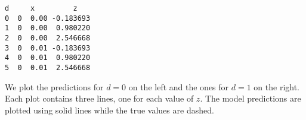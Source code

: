 \documentclass{scrartcl}
\makeatletter
\newcommand{\boxspacing}{\kern\kvtcb@left@rule\kern\kvtcb@boxsep}
\newcommand{\prompt}[4]{
        {\ttfamily\llap{{\color{#2}[#3]:\hspace{3pt}#4}}\vspace{-\baselineskip}}
    }
\makeatother
\begin{document}
            \begin{tcolorbox}[breakable, size=fbox, boxrule=.5pt, pad at break*=1mm, opacityfill=0]
\prompt{Out}{outcolor}{51}{\boxspacing}
\begin{Verbatim}[commandchars=\\\{\}]
   d     x         z
0  0  0.00 -0.183693
1  0  0.00  0.980220
2  0  0.00  2.546668
3  0  0.01 -0.183693
4  0  0.01  0.980220
5  0  0.01  2.546668
\end{Verbatim}
\end{tcolorbox}
        
    We plot the predictions for \(d=0\) on the left and the ones for \(d=1\)
on the right. Each plot contains three lines, one for each value of
\(z\). The model predictions are plotted using solid lines while the
true values are dashed.
\end{document}

